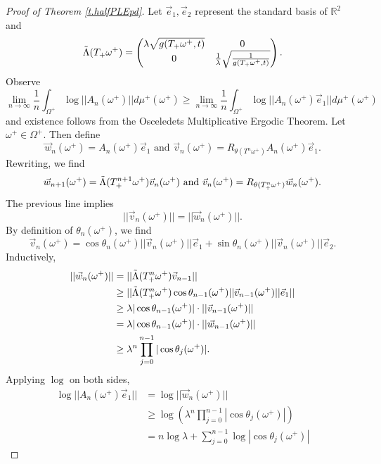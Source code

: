 \documentclass{amsart}
\newcommand{\RR}{\mathbb{R}}
\begin{document}
\begin{proof}[Proof of Theorem \ref{t.halfPLEpd}]
    Let $\vec{e}_1, \vec{e}_2$ represent the standard basis of $\RR^2$ and 
    \[\Tilde{\Lambda}(T_+\omega^+) = \begin{pmatrix}
        \lambda \sqrt{g(T_+\omega^+, t)} & 0 \\
        0 & \frac{1}{\lambda} \sqrt{\frac{1}{g(T_+\omega^+, t)}}
    \end{pmatrix}.\] 
    Observe 
    \[\lim_{n\rightarrow \infty} \frac{1}{n}\int_{\Omega^+} \log||A_n(\omega^+)|| d\mu^+(\omega^+) \geq \lim_{n\rightarrow \infty} \frac{1}{n}\int_{\Omega^+} \log||A_n(\omega^+)\vec{e}_1|| d\mu^+(\omega^+)\]
    and existence follows from the Osceledets Multiplicative Ergodic Theorem. Let $\omega^+\in \Omega^+$. Then define
    \[\vec{w}_n(\omega^+) = A_n(\omega^+)\vec{e}_1 \text{ and } \vec{v}_n(\omega^+) = R_{\theta(T^n\omega^+)}A_n(\omega^+)\vec{e}_1.\]
    Rewriting, we find
    \[\vec{w}_{n+1}(\omega^+) = \Tilde{\Lambda}(T^{n+1}_+\omega^+) \vec{v}_{n}(\omega^+) \text{ and } \vec{v}_n(\omega^+) = R_{\theta(T^n_+\omega^+)}\vec{w}_n(\omega^+).\]
    The previous line implies
    \[||\vec{v}_n(\omega^+)|| = ||\vec{w}_n(\omega^+)||.\]
    By definition of $\theta_n(\omega^+)$, we find
    \[\vec{v}_n(\omega^+) = \cos\theta_n(\omega^+)||\vec{v}_n(\omega^+)||\vec{e}_1 + \sin\theta_n(\omega^+)||\vec{v}_n(\omega^+)||\vec{e}_2.\]
    Inductively, 
    \begin{align*}
        ||\vec{w}_n(\omega^+)|| &= ||\Tilde{\Lambda}(T^{n}_+\omega^+) \vec{v}_{n-1}||\\
        &\geq ||\Tilde{\Lambda}(T^{n}_+\omega^+)\cos\theta_{n-1}(\omega^+)||\vec{v}_{n-1}(\omega^+)||\vec{e}_1||\\
        &\geq \lambda|\cos\theta_{n-1}(\omega^+)| \cdot ||\vec{v}_{n-1}(\omega^+)||\\
        &= \lambda|\cos\theta_{n-1}(\omega^+)|\cdot ||\vec{w}_{n-1}(\omega^+)||\\
        &\geq \lambda^n \prod_{j=0}^{n-1}|\cos\theta_j(\omega^+)|.
    \end{align*}
    Applying $\log$ on both sides,
    \begin{align*}
        \log||A_n(\omega^+)\vec{e}_1|| &= \log||\vec{w}_n(\omega^+)||\\
        &\geq \log(\lambda^n \prod_{j=0}^{n-1}|\cos\theta_j(\omega^+)|) \\
        &= n\log \lambda + \sum_{j=0}^{n-1} \log|\cos\theta_j(\omega^+)| 
    \end{align*}

\end{proof}
\end{document}
